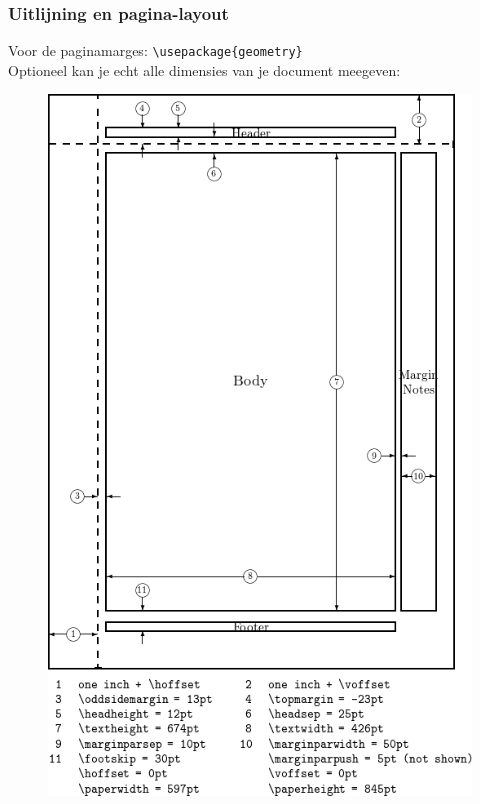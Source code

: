 \documentclass{beamer}
\begin{document}
\begin{frame}
	\frametitle{Uitlijning en pagina-layout}
	Voor de paginamarges: \texttt{\textbackslash usepackage\{geometry\} }\\
	Optioneel kan je echt alle dimensies van je document meegeven:
	\begin{figure}
			\includegraphics[height=0.9\textheight]{assets/Layout-dimensions.png}
	\end{figure}
\end{frame}
\end{document}
